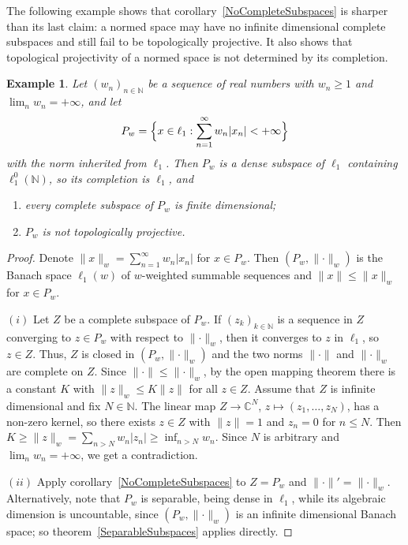 \documentclass[12pt]{article}
\newtheorem{example}[theorem]{Example}
\newcommand{\lo}[1]{\ell_1^0(#1)}
\newcommand{\norm}[1]{\lVert #1\rVert}
\begin{document}
The following example shows that corollary~\ref{NoCompleteSubspaces} is
sharper than its last claim: a normed space may have no infinite dimensional
complete subspaces and still fail to be topologically projective. It also
shows that topological projectivity of a normed space is not determined by its
completion.

\begin{example}\label{WeightedExample} Let ${(w_n)}_{n\in\mathbb{N}}$ be a
    sequence of real numbers with $w_n\geq 1$ and $\lim_n w_n=+\infty$, and let
    \[
    P_w=\Bigl\{x\in\ell_1:\sum_{n=1}^\infty w_n|x_n|<+\infty\Bigr\}
    \]
    with the norm inherited from $\ell_1$. Then $P_w$ is a dense subspace of
    $\ell_1$ containing $\lo{\mathbb{N}}$, so its completion is $\ell_1$, and
    \begin{enumerate}[label = (\roman*)]
        \item every complete subspace of $P_w$ is finite dimensional;
        \item $P_w$ is not topologically projective.
    \end{enumerate}
\end{example}
\begin{proof} Denote $\norm{x}_w=\sum_{n=1}^\infty w_n|x_n|$ for $x\in P_w$.
    Then $(P_w,\norm{\cdot}_w)$ is the Banach space $\ell_1(w)$ of
    $w$-weighted summable sequences and $\norm{x}\leq\norm{x}_w$ for $x\in
    P_w$.

    $(i)$ Let $Z$ be a complete subspace of $P_w$. If ${(z_k)}_{k\in\mathbb{N}}$
    is a sequence in $Z$ converging to $z\in P_w$ with respect to
    $\norm{\cdot}_w$, then it converges to $z$ in $\ell_1$, so $z\in Z$. Thus,
    $Z$ is closed in $(P_w,\norm{\cdot}_w)$ and the two norms $\norm{\cdot}$
    and $\norm{\cdot}_w$ are complete on $Z$. Since $\norm{\cdot}\leq
    \norm{\cdot}_w$, by the open mapping theorem there is a constant $K$ with
    $\norm{z}_w\leq K\norm{z}$ for all $z\in Z$. Assume that $Z$ is infinite
    dimensional and fix $N\in\mathbb{N}$. The linear map $Z\to\mathbb{C}^N$,
    $z\mapsto(z_1,\ldots,z_N)$, has a non-zero kernel, so there exists $z\in
    Z$ with $\norm{z}=1$ and $z_n=0$ for $n\leq N$. Then
    $K\geq\norm{z}_w=\sum_{n>N}w_n|z_n|\geq\inf_{n>N}w_n$. Since $N$ is
    arbitrary and $\lim_n w_n=+\infty$, we get a contradiction.

    $(ii)$ Apply corollary~\ref{NoCompleteSubspaces} to $Z=P_w$ and
    $\norm{\cdot}'=\norm{\cdot}_w$. Alternatively, note that $P_w$ is
    separable, being dense in $\ell_1$, while its algebraic dimension is
    uncountable, since $(P_w,\norm{\cdot}_w)$ is an infinite dimensional
    Banach space; so theorem~\ref{SeparableSubspaces} applies directly.
\end{proof}
\end{document}
